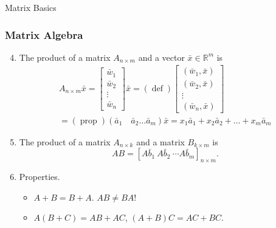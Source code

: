 \documentclass{beamer}
\begin{document}
\begin{section}{Matrix Basics}
\begin{frame}
        \frametitle{Matrix Algebra}
        \begin{enumerate}\setcounter {enumi} {3}
            \item The product of a matrix $A_{n \times m}$ and a vector $\bar{x} \in \mathbb{R}^m$ is 
            \begin{equation*}
                \begin{gathered}
                    A_{n \times m} \bar{x}=\left[\begin{array}{c}
                    \bar{w}_{1} \\
                    \bar{w}_{2} \\
                    \vdots \\
                    \bar{w}_{n}
                    \end{array}\right] \bar{x}
                    =(\operatorname{def})\left[\begin{array}{c}
                    \left(\bar{w}_{1}, \bar{x}\right) \\
                    \left(\bar{w}_{2}, \bar{x}\right) \\
                    \vdots \\
                    \left(\bar{w}_{n}, \bar{x}\right)
                    \end{array}\right] \\
                    =(\operatorname{prop})\left(\bar{a}_{1} \quad \bar{a}_{2} \ldots \bar{a}_{m}\right) \bar{x}=x_{1} \bar{a}_{1}+x_{2} \bar{a}_{2}+\ldots+x_{m} \bar{a}_{m}
                \end{gathered}
            \end{equation*} 

            \item The product of a matrix $A_{n \times k}$ and a matrix $B_{k \times m}$ is 
            \begin{equation*}  
                AB = \left[ A\bar{b}_1 \ A\bar{b}_2 \ \cdots A\bar{b}_m \right]_{n \times m}.
            \end{equation*}

            \item Properties.  
            \begin{itemize}
                \item $A+B = B+A$. $AB \neq BA$!
                \item $A(B+C) = AB + AC$, $(A+B)C = AC + BC$. 
            \end{itemize} 
        \end{enumerate}
    \end{frame}


\end{section}
\end{document}
